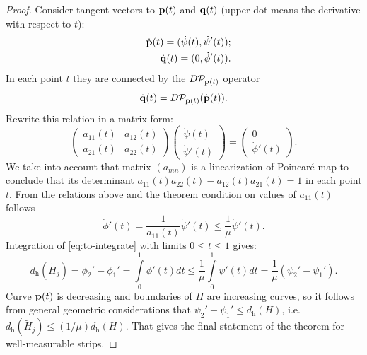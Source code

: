 \begin{proof}
	Consider tangent vectors to $\vb{p}(t)$ and $\vb{q}(t)$ (upper dot means the derivative with respect to $t$):
	\begin{eqnarray}
		&& \dot{\vb{p}}(t) = (\dot{\psi}(t), \dot{\psi}'(t)); \\
		&& \dot{\vb{q}}(t) = (0, \dot{\phi}'(t)).
	\end{eqnarray}
	In each point $t$ they are connected by the $D \mathcal{P}_{\vb{p}(t)}$ operator
	\begin{equation}
		\dot{\vb{q}}(t) = D \mathcal{P}_{\vb{p}(t)} (\dot{\vb{p}}(t)).
	\end{equation}
	Rewrite this relation in a matrix form:
	\begin{equation}
		\begin{pmatrix}
			a_{11}(t) & a_{12}(t) \\ a_{21}(t) & a_{22}(t)
		\end{pmatrix}
		\begin{pmatrix}
			\dot{\psi}(t) \\
			\dot{\psi}'(t)
		\end{pmatrix} =
		\begin{pmatrix}
			0 \\ \dot{\phi}'(t)
		\end{pmatrix}.
	\end{equation}
	We take into account that matrix $(a_{mn})$ is a linearization of Poincar\'e map to conclude that its determinant $a_{11}(t) a_{22}(t) - a_{12}(t) a_{21}(t) = 1$ in each point $t$.
	From the relations above and the theorem condition on values of $a_{11}(t)$ follows
	\begin{equation}
		\dot{\phi}'(t) = \dfrac{1}{a_{11}(t)} \dot{\psi}'(t) \le \dfrac{1}{\mu} \dot{\psi}'(t).
	\label{eq:to-integrate}
	\end{equation}
	Integration of \eqref{eq:to-integrate} with limits $0 \le t \le 1$ gives:
	\begin{equation}
		d_{\mathrm{h}}(\widetilde{H}_j) = \phi_2' - \phi_1' = \int \limits_0^1 \dot{\phi}'(t) dt \le \dfrac{1}{\mu} \int \limits_0^1 \dot{\psi}'(t) dt = \dfrac{1}{\mu} (\psi_2' - \psi_1').
	\label{eq:thickness-of-strip-final}
	\end{equation}
	Curve $\vb{p}(t)$ is decreasing and boundaries of $H$ are increasing curves, so it follows from general geometric considerations that $\psi_2' - \psi_1' \le d_{\mathrm{h}}(H)$, i.e. $d_{\mathrm{h}}(\widetilde{H}_j) \le (1 / \mu) d_{\mathrm{h}}(H)$.
	That gives the final statement of the theorem for well-measurable strips.
	

\end{proof}
